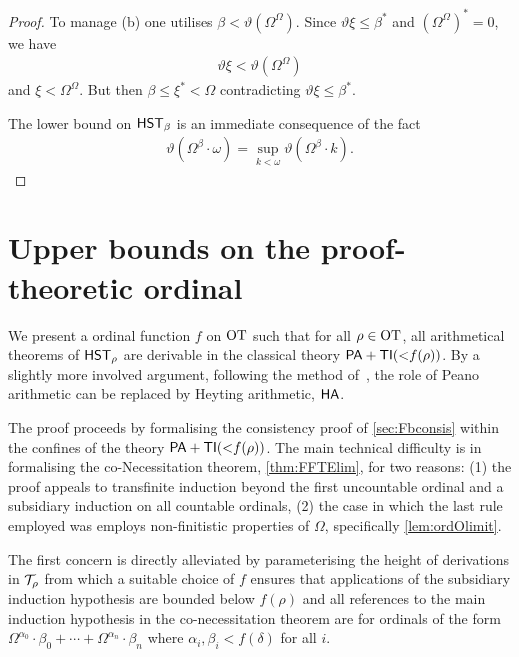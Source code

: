 \documentclass[UKenglish,cleveref,DIV=12]{scrartcl}
\theoremstyle{definition}
\theoremstyle{definition}
\begin{document}
\begin{proof}
To manage (b) one utilises $\beta<\vartheta(\Omega^\Omega)$. Since
$\vartheta\xi\le\beta^*$ and $(\Omega^\Omega)^*=0$, we have
\begin{align*}
  \vartheta\xi<\vartheta(\Omega^\Omega)
\end{align*}
and $\xi<\Omega^\Omega$. %
But then $\beta\le\xi^*<\Omega$
contradicting $\vartheta\xi\le\beta^*$.

The lower bound on $\mathsf{HST}_\beta$ is an immediate consequence of the fact
\begin{align*}
  \vartheta(\Omega^{\beta}\cdot \omega)=\sup_{k<\omega}\vartheta(\Omega^{\beta}\cdot k).
\end{align*}
\end{proof}

\section{Upper bounds on the proof-theoretic ordinal}\label{sec:Fbupper1}


We present a ordinal function \( f \) on \( \mathrm{OT} \) such that for all \( \rho \in \mathrm{OT} \), all arithmetical theorems of $\mathsf{HST}_\rho$ are derivable in the classical theory $\mathsf{PA}+\mathsf{TI}({<}f(\rho))$.
By a slightly more involved argument, following the method of~\cite{LeiRat10}, the role of Peano arithmetic can be replaced by Heyting arithmetic, \( \mathsf{HA} \). 

The proof proceeds by formalising the consistency proof of \cref{sec:Fbconsis} within the confines of the theory $\mathsf{PA}+\mathsf{TI}({<}f(\rho))$. 
The main technical difficulty is in formalising the co-Necessitation theorem, \cref{thm:FFTElim}, for two reasons:
(1) the proof appeals to transfinite induction beyond the first uncountable ordinal and a subsidiary induction on all countable ordinals,
(2) the case in which the last rule employed was \Uni\eta{} employs non-finitistic properties of $\Omega$, specifically \cref{lem:ordOlimit}.

The first concern is directly alleviated by parameterising the height of derivations in $\mathcal{T}_\rho$ from which a suitable choice of \( f \) ensures that applications of the subsidiary induction hypothesis are bounded below \( f(\rho) \) and all references to the main induction hypothesis in the co-necessitation theorem are for ordinals of the form
$\Omega^{\alpha_0}\cdot\beta_0+\cdots+\Omega^{
\alpha_n}\cdot\beta_n$ where $\alpha_i,\beta_i< f(\delta)$ for all $i$.
\end{document}
